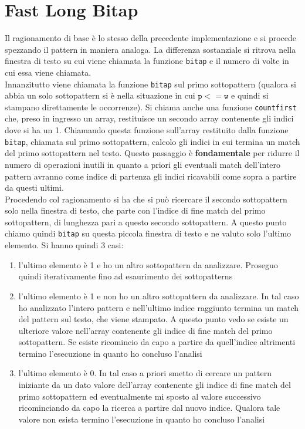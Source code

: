 \documentclass[a4paper,12pt, oneside]{article}
\begin{document}
\section*{Fast Long Bitap}
Il ragionamento di base è lo stesso della precedente implementazione e
si procede spezzando il pattern in maniera analoga. La differenza
sostanziale si ritrova nella finestra di testo su cui viene chiamata
la funzione \texttt{bitap} e il numero di volte in cui essa viene
chiamata.\\
Innanzitutto viene chiamata la funzione \texttt{bitap} sul primo
sottopattern (qualora si abbia un solo sottopattern si è nella
situazione in cui $\mathtt{p}<=\mathtt{w}$ e quindi si stampano
direttamente le occorrenze). Si chiama anche una funzione
\texttt{countfirst} che, preso in ingresso un array, restituisce un
secondo array contenente gli indici dove si ha un 1. Chiamando questa
funzione sull'array restituito dalla funzione \texttt{bitap}, chiamata
sul primo sottopattern, calcolo gli indici in cui termina un match del
primo sottopattern nel testo. Questo passaggio è \textbf{fondamentale}
per ridurre il numero di operazioni inutili in quanto a priori gli
eventuali match dell'intero pattern avranno come indice di partenza
gli indici ricavabili come sopra a partire da questi ultimi.\\
Procedendo col ragionamento si ha che si può ricercare il secondo
sottopattern solo nella finestra di testo, che parte con l'indice di
fine match del primo sottopattern, di lunghezza pari a questo secondo
sottopattern. A questo punto chiamo quindi \texttt{bitap} su questa
piccola finestra di testo e ne valuto solo l'ultimo elemento. Si hanno
quindi 3 casi:
\begin{enumerate}
  \item l'ultimo elemento è 1 e ho un altro sottopattern da
  analizzare. Proseguo quindi iterativamente fino ad esaurimento dei
  sottopatterns
  \item l'ultimo elemento è 1 e non ho un altro sottopattern da
  analizzare. In tal caso ho analizzato l'intero pattern e nell'ultimo
  indice raggiunto termina un match del pattern sul testo, che viene
  stampato. A questo punto vedo se esiste un ulteriore valore
  nell'array contenente gli indice di fine match del primo
  sottopattern. Se esiste ricomincio da capo a partire da quell'indice
  altrimenti termino l'esecuzione in quanto ho concluso l'analisi
  \item l'ultimo elemento è 0. In tal caso a priori smetto di cercare
  un pattern iniziante da un dato valore dell'array contenente gli
  indice di fine match del primo sottopattern ed eventualmente mi
  sposto al valore successivo ricominciando da capo la ricerca a
  partire dal nuovo indice. Qualora tale valore non esista  termino
  l'esecuzione in quanto ho concluso l'analisi 
\end{enumerate}
\end{document}
